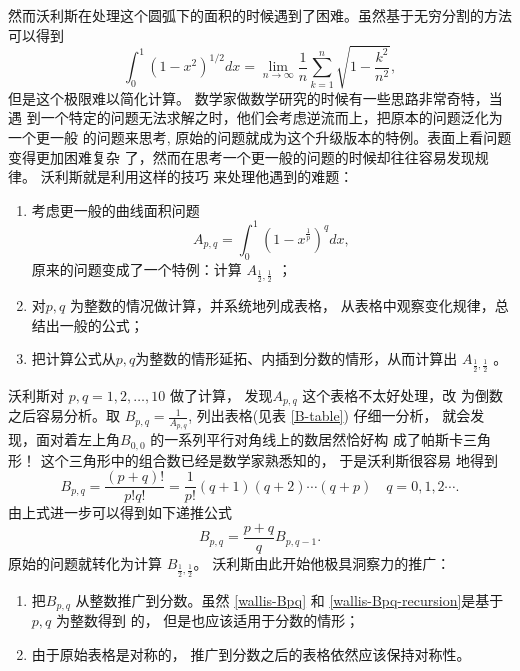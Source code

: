{然而沃利斯在处理这个圆弧下的面积的时候遇到了困难。虽然基于无穷分割的方法可以得到 
$$ \int_0^1 (1-x^2)^{1/2} dx = \lim_{n\rightarrow \infty} \frac{1}{n} \sum^n_{k=1} \sqrt{1-\frac{k^2}{n^2}} ,$$ 
但是这个极限难以简化计算。 数学家做数学研究的时候有一些思路非常奇特，当遇
到一个特定的问题无法求解之时，他们会考虑逆流而上，把原本的问题泛化为一个更一般
的问题来思考, 原始的问题就成为这个升级版本的特例。表面上看问题变得更加困难复杂
了，然而在思考一个更一般的问题的时候却往往容易发现规律。 沃利斯就是利用这样的技巧
来处理他遇到的难题：

\begin{enumerate}
\item 考虑更一般的曲线面积问题
$$ A_{p,q} = \int_0^1 (1-x^\frac{1}{p})^q dx ,$$ 
原来的问题变成了一个特例：计算 $A_{\frac{1}{2},\frac{1}{2}}$ ；

\item 对$p,q$ 为整数的情况做计算，并系统地列成表格， 从表格中观察变化规律，总结出一般的公式；
\item 把计算公式从$p,q$为整数的情形延拓、内插到分数的情形，从而计算出
$A_{\frac{1}{2},\frac{1}{2}}$ 。
\end{enumerate}

沃利斯对 $p,q = 1,2,\ldots,10$ 做了计算， 发现$A_{p,q}$ 这个表格不太好处理，改
为倒数之后容易分析。取 $B_{p,q} = \frac{1}{A_{p,q}}$, 列出表格(见表 \ref{B-table})
仔细一分析， 就会发现，面对着左上角$B_{0,0}$ 的一系列平行对角线上的数居然恰好构
成了帕斯卡三角形！ 这个三角形中的组合数已经是数学家熟悉知的， 于是沃利斯很容易
地得到
\begin{equation}
\label{wallis-Bpq}
B_{p,q} = \frac{(p+q)!} {p! q!} = \frac{1}{p!} (q+1) (q+2) \cdots (q+p) \quad q=0,1,2 \cdots .
\end{equation}
由上式进一步可以得到如下递推公式
\begin{equation}
\label{wallis-Bpq-recursion}
B_{p,q} = \frac{p+q}{q} B_{p,q-1} .
\end{equation}
原始的问题就转化为计算 $B_{\frac{1}{2},\frac{1}{2}}$。 沃利斯由此开始他极具洞察力的推广：
\begin{enumerate}
\item 把$B_{p,q}$ 从整数推广到分数。虽然 \eqref{wallis-Bpq} 和 \eqref{wallis-Bpq-recursion}是基于$p,q$ 为整数得到
的， 但是也应该适用于分数的情形；
\item 由于原始表格是对称的， 推广到分数之后的表格依然应该保持对称性。
\end{enumerate}


}
